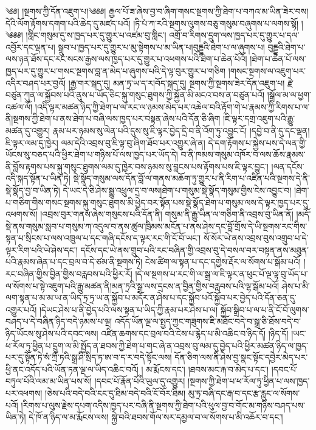 \setcounter{footnote}{0} 
༄༅། །སྔགས་ཀྱི་དོན་འཇུག་པ།༄༅༅། རྒྱལ་པོ་ཟ་ཞེས་བྱ་བ་ཞིག་གསང་སྔགས་ཀྱི་ཐེག་པ་བཀའ་མ་ཡིན་ཟེར་བས། དེའི་ལོག་རྟོགས་དགག་པའི་ཆེད་དུ་མཛད་པའོ། །ཏི་པཾ་ཀ་རའི་སྔགས་ལུགས་བཅུ་གསུམ་བཞུགས་པ་ལགས་སྷོ། ། ༄༅༅། །གླིང་གསུམ་དུ་ས་ཁྱད་པར་དུ་གྱུར་པ་འཛམ་བུ་གླིང་། འགྲོ་བ་རིགས་དྲུག་ལས་ཁྱད་པར་དུ་གྱུར་པ་དལ་འབྱོར་དང་ལྡན་པ། སྒྲུབ་པ་ཁྱད་པར་དུ་གྱུར་པ་མུ་སྟེགས་པ་མ་ཡིན་པ།བུདྡྷའི་ཐེག་པ་ལ་ཞུགས་པ། བུདྡྷའི་ཐེག་པ་ལས་ཉན་ཐོས་དང་རང་སངས་རྒྱས་ལས་ཁྱད་པར་དུ་གྱུར་པ་འཕགས་པའི་ཐེག་པ་ཆེན་པོའོ། །ཐེག་པ་ཆེན་པོ་ལས་ཁྱད་པར་དུ་གྱུར་པ་གསང་སྔགས་བླ་ན་མེད་པ་ཞུགས་པའི་དེ་ལྟ་བུར་གྱུར་པ་གཅིག །གསང་སྔགས་ལ་འཇུག་པར་འདིར་བཤད་པར་བྱའོ། །རྒྱ་གར་སྐད་དུ། མན་ཏྲ་ཡ་ད་ར།བོད་སྐད་དུ། སྔགས་ཀྱི་སྔགས་ཟེར་དོན་འཇུག་པ། རྗེ་བཙུན་ཀུན་ལ་སྐྱོབས་པའི་ནུས་པ་ཡོད་ཅིང་སྐུ་གསུང་ཐུགས་ཀྱི་སྐྱོན་མི་མངའ་བས་ན་བཙུན་པའོ། །སྒྲོལ་མ་ལ་ཕྱག་འཚལ་ལོ། །འདི་ལྟར་མཚན་ཉིད་ཀྱི་ཐེག་པ་ལ་རང་ལ་ཉམས་མེད་པར་འཆེལ་བའི་རྟོག་གེ་པ་རྣམས་ཀྱི་རིགས་པ་ལ་ནི།སྔགས་ཀྱི་ཐེག་པ་ནས་ཐེག་པ་བཞི་ལས་ཁྱད་པར་བསྟན་ཞེས་པའི་དོན་ཅི་ཞིག །ཇི་ལྟར་དགྲ་འཇུག་པའི་རྒྱུ་མཚན་དུ་འགྱུར། རྣམ་པར་ཉམས་སུ་ལེན་པའི་དུས་སུ་ཇི་ལྟར་བྱེད་དྲི་བ་ནི་འོག་ཏུ་འབྱུང་ངོ། །དབྱེ་བ་ནི་དུ་དང་ལྡན། ཇི་ལྟར་ལམ་དུ་ཁྱེར། ལམ་དེའི་འབྲས་བུ་ཇི་ལྟ་བུ་ཞིག་ཐོབ་པར་འགྱུར་ཞེ་ན། དེ་དག་རྟོགས་པ་སྐྱེས་པས་དེ་ལན་གྱི་ཡོངས་སུ་བཅད་པའི་ཕྱིར་ཐེག་པ་གཉིས་པོ་ལས་ཁྱད་པར་ཡོད་དེ། བ་ནི་ཁམས་གསུམ་འཁོར་བ་ལས་ཆོས་རྣམས་ནི་བློས་རྟགས་པས་སྐུ་གསུང་ཐུགས་ལམ་དུ་ཁྱེར་བས་ཉམས་སུ་བླངས་པས་རྟོགས་པས་ཇི་ལྟར་བྱུང་། །ལན་དངོས་འདི་སྐད་སྟོན་པ་ཡིན་ཏེ། སྡེ་སྣོད་གསུམ་ལས་དོན་བློ་ལ་གནས་མཆོག་ཏུ་གྱུར་པ་ནི་རིག་པ་འཛིན་པའི་སྔགས་དེ་ནི་སྡེ་སྣོད་བྱ་བ་ཡིན་ཏེ། དེ་ཡང་དེ་ཅི་ཤེས་སྒྱུ་འཕྲུལ་དྲ་བ་ལས།ཐེག་པ་གསུམ་སྡེ་སྣོད་གསུམ་གྱིས་ངེས་འབྱུང་བ། །ཐེག་པ་གཅིག་གིས་གསང་སྔགས་སྐུ་གསུང་ཐུགས་མི་ཕྱེད་བར་སྟོན་པས་སྡེ་སྣོད་ཐེག་པ་གསུམ་ལས་དེ་ལྟར་ཁྱད་པར་དུ་འཕགས་སོ། །འབྲས་བུར་གནས་ཞེས་གསུངས་པའི་དོན་ནི། གསུམ་ནི་རྒྱུ་ཡིན་ལ་གཅིག་ནི་འབྲས་བུ་ཡིན་ནོ། །མདོ་སྡེ་ནས་གསུམ་སླབ་པ་གསུམ་ཀ་འདུལ་བ་ནས་ཚུལ་ཁྲིམས་མངོན་པ་ནས་ཤེས་དང་བློ་གྲོས་དེ་ཡི་སྔགས་རང་གིས་སྟན་པ་སྲིངས་པ་ལས་འཁྲུལ་པ་དང་གཞི་དངོས་ད་ལྟར་རང་གི་ངོ་བོ་ཡང་། སོ་སོར་ཡེ་ནས་འབྲས་བུས་འགྲུབ་པ་དེ་ལྟར་རིག་པའི་ཡེ་ཤེས་དང་། དངོས་དང་ཡེ་ནས་གྲུབ་པའི་རང་བཞིན་གྱི་འབྲས་བུ་དེ་བསལ་བར་བསྟན་ནས་མཐུན་པའི་རྣམས་ཞེན་པ་དང་བྲལ་བ་དེ་ཙམ་ནི་སྔགས་ཏེ། ངེས་ཚིག་ལ་སྟན་པ་དང་དགྱེས་རྡོར་ལ་སོགས་པ་སྒོམ་པའོ། །རང་བཞིན་གྱིས་བྱིན་གྱིས་བརླབས་པའི་ཕྱིར་རོ། །དེ་ལ་སྔགས་པ་རང་གི་ལ་སྒྲ་ལ་ཇི་ལྟར་ན་ཕུང་པོ་ལྔ་ལྟ་བུ་ཡོད་པ་ལ་སོགས་པ་སྟེ་འཇུག་པའི་རྒྱུ་མཚན་ནི།མན་ཏྲའི་སྒྲ་ལས་དྲངས་ན་བྱིན་གྱིས་བརླབས་པའི་ལྷ་སྒོམ་པའོ། ཤེས་པ་མི་ལག་སྟན་པ་མ་མ་ཡ་ན་ཡིད་ཏྲ་ཏྲ་ཡ་ན་སྐྱོབ་པ་མདོར་ན་ཤེས་པ་དང་སྐྱོབ་པའོ་སྐྱོབ་པར་བྱེད་པའི་དོན་ཅན་དུ་འགྱུར་པའོ། །དེཡང་ཤེས་པ་ནི་བྱེད་པའི་ལས་སྟན་པ་ཡིད་ཀྱི་རྣམ་པར་ཤེས་པ་ལ། སྐྱོབ་སྒྲིབ་པ་ལ་པ་ནི་ངོ་བོ་ལུགས་བཤད་པ་དེ་བཞིན་ཉིད་བདེ་ཉམས་པ་ལྔ། འདོད་ཡོན་ལྔ་ལ་སྤྱད་ཀྱང་གཟུགས་ཇི་མཐོང་བདེ་བ་སྒྲ་ཅི་ཐོས་བདེ་བ་ཉིད་ཡོངས་སུ་ཤེས་པའི་དབང་ལས། འཛིན་ཆགས་དང་བྲལ་བའི་ངེས་པ་རྙེད་པ་མི་འཆིང་བ་ཉིད་དོ། །ཉིད་དོ། །ཡང་ཕ་རོལ་ཏུ་ཕྱིན་པ་དྲུག་ལ་མི་སྤྱོད་ན་ཐབས་ཀྱི་ཐེག་པ་གང་ཞེ་ན་འབྲས་བུ་ལམ་དུ་བྱེད་པའི་ཕྱིར་མཚན་ཉིད་ལ་ཁྱད་པར་དུ་སྟོན་ཏེ་སཾ་ཀྲྀ་ཏའི་སྒྲ་ཤི་སྲིད་ཏ་ཨ་བ་ད་ར་བདེ་སྟོང་ལས། དོན་ཅིག་ལས་ནི་ཤེས་བྱ་སྣང་སྟོང་དབྱེར་མེད་པར་ཕྱི་ནང་འདོད་པའི་ཡོན་ཏན་ལྔ་ལ་ཡིད་འཆིང་བའོ། ། མ་རྨོངས་དང་། །ཐབས་མང་རྐ་བ་མེད་པ་དང་། །དབང་པོ་བཏུལ་པོའི་ལམ་མ་ཡིན་པས་སོ། །དབང་པོ་རྣོན་པོའི་ཡུལ་དུ་འགྱུར། །སྔགས་ཀྱི་ཐེག་པ་ཕ་རོལ་ཏུ་ཕྱིན་པ་ལས་ཁྱད་པར་འཕགས། །ཅེས་པའི་བདེ་བའི་ངང་དུ་ཐིམ་བདེ་བའི་ངོ་བོར་ཐིམ། མུ་ཏྲ་བཞི་དང་རྒ་བ་དང་རྩ་རླུང་ལ་སོགས་པའོ། །རིགས་པ་ལུས་རྗེས་དཔག་འདིས་ཁྱད་པར་བཞི་ནི་སྔགས་ཀྱི་ཐེག་པའི་ཕུལ་བྱ་བ་གོང་མ་གཉིས་བཤད་པས་ཡིན་ཏེ། དེ་ཁོ་ན་ཉིད་ལ་མ་རྨོངས་ལས། སྐྱེ་བའི་ཐབས་གོལ་སར་དམྱལ་བ་ལ་སོགས་པ་མི་འཆོར་བ་དང་། 